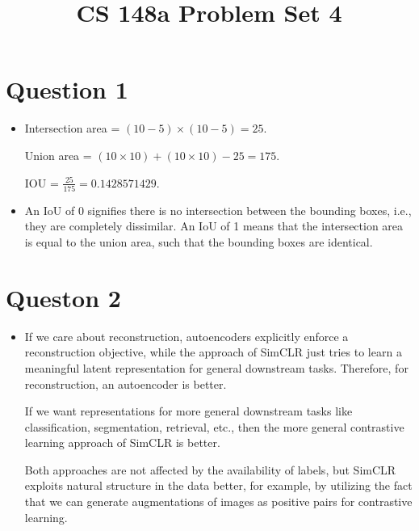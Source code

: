 \documentclass{article}
\title{CS 148a Problem Set 4}
\date{}
\begin{document}
\maketitle

\newpage

\section*{Question 1}
\begin{itemize}
    \item[(i)] Intersection area = $(10 - 5) \times (10 - 5) = 25$.

    Union area = $(10 \times 10) + (10 \times 10) - 25 = 175$.

    IOU = $\frac{25}{175} = 0.1428571429$.

    \item[(ii)] An IoU of 0 signifies there is no intersection between the bounding boxes, i.e., they are completely dissimilar. An IoU of 1 means that the intersection area is equal to the union area, such that the bounding boxes are identical.
\end{itemize}

\newpage
\section*{Queston 2}
\begin{itemize}
    \item[(c)]  If we care about reconstruction, autoencoders explicitly enforce a reconstruction objective, while the approach of SimCLR just tries to learn a meaningful latent representation for general downstream tasks. Therefore, for reconstruction, an autoencoder is better.
    
    If we want representations for more general downstream tasks like classification, segmentation, retrieval, etc., then the more general contrastive learning approach of SimCLR is better.

    Both approaches are not affected by the availability of labels, but SimCLR exploits natural structure in the data better, for example, by utilizing the fact that we can generate augmentations of images as positive pairs for contrastive learning.
\end{itemize}

\newpage
\end{document}
